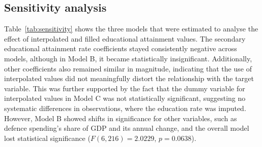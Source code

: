 \subsection{Sensitivity analysis}

Table~\ref{tab:sensitivity} shows the
three models that were estimated to analyse the effect of interpolated and filled educational attainment values.
The secondary educational attainment rate coefficients stayed consistently negative
across models, although in Model B, it became statistically insignificant. 
Additionally, other coefficients also remained similar in magnitude, indicating 
that the use of interpolated values did not meaningfully distort the 
relationship with the target variable. This was further supported by the fact that 
the dummy variable for 
interpolated values in Model C was not statistically significant, suggesting no systematic 
differences in observations, where the education rate was imputed.
However, Model B showed shifts in significance for other variables, 
such as defence spending's share of GDP and its annual change, 
and the overall model lost
statistical significance ($F(6,216)=2.0229$, $p=0.0638$).

\renewcommand{\arraystretch}{1.2}

